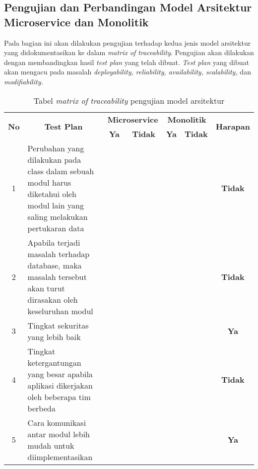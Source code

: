 \subsection{Pengujian dan Perbandingan Model Arsitektur Microservice dan Monolitik}
Pada bagian ini akan dilakukan pengujian terhadap kedua jenis model arsitektur yang didokumentasikan ke dalam \textit{matrix of traceability}. Pengujian akan dilakukan dengan membandingkan hasil \textit{test plan} yang telah dibuat. \textit{Test plan} yang dibuat akan mengacu pada masalah \textit{deployability, reliability, availability, scalability,} dan \textit{modifiability.}
\begin{table}[H]
	\centering
	\caption{Tabel \textit{matrix of traceability} pengujian model arsitektur}
	\label{my-label}
	\begin{adjustbox}{width=1\textwidth}
		\begin{tabular}{|p{1cm}|p{8.5cm}|p{1cm}|p{1cm}|p{1cm}|p{1cm}|p{1cm}|}
			\hline
			\multicolumn{1}{|c|}{\multirow{2}{*}{\textbf{No}}} & \multicolumn{1}{c|}{\multirow{2}{*}{\textbf{Test Plan}}} & \multicolumn{2}{c|}{\textbf{Microservice}}& \multicolumn{2}{c|}{\textbf{Monolitik}} & \multicolumn{1}{c|}{\multirow{2}{*}{\textbf{Harapan}}}\\ \cline{3-6} 
			\multicolumn{1}{|c|}{}                  & \multicolumn{1}{c|}{}                  & \multicolumn{1}{c|}{\textbf{Ya}} & \multicolumn{1}{c|}{\textbf{Tidak}} & \multicolumn{1}{c|}{\textbf{Ya}} & \multicolumn{1}{c|}{\textbf{Tidak}} & \multicolumn{1}{c|}{}\\ \hline
			\multicolumn{1}{|c|}{1}&Perubahan yang dilakukan pada class dalam sebuah modul harus diketahui oleh modul lain yang saling melakukan pertukaran data&&\checkmark&\checkmark&&\multicolumn{1}{c|}{\textbf{Tidak}}\\ \hline
			\multicolumn{1}{|c|}{2}&Apabila terjadi masalah terhadap database, maka masalah tersebut akan turut dirasakan oleh keseluruhan modul&&\checkmark&\checkmark&&\multicolumn{1}{c|}{\textbf{Tidak}}\\ \hline
			\multicolumn{1}{|c|}{3}&Tingkat sekuritas yang lebih baik&\checkmark&&&\checkmark&\multicolumn{1}{c|}{\textbf{Ya}}\\ \hline
			\multicolumn{1}{|c|}{4}&Tingkat ketergantungan yang besar apabila aplikasi dikerjakan oleh beberapa tim berbeda&&\checkmark&\checkmark&&\multicolumn{1}{c|}{\textbf{Tidak}}\\ \hline
			\multicolumn{1}{|c|}{5}&Cara komunikasi antar modul lebih mudah untuk diimplementasikan&&\checkmark&\checkmark&&\multicolumn{1}{c|}{\textbf{Ya}}\\ \hline

\end{tabular}
\end{adjustbox}
\end{table}
